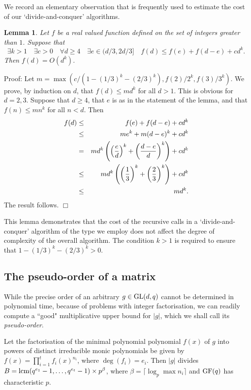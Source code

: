 \documentclass[12pt]{article}
\newtheorem{lemma}[definition]{Lemma}
\newenvironment{proof}{\normalsize {\sc Proof}:}{{\hfill $\Box$ \\}}
\def\lcm{{\rm lcm}}
\def\GL{{\rm GL}}
\def\Oh{O}  %
\def\GF{{\rm GF}}
\def\q{\quad}
\begin{document}
We record an elementary observation that is frequently used to estimate
the cost of our `divide-and-conquer' algorithms.
\begin{lemma}\label{d-a-c}
Let $f$ be a real valued function defined on the set of 
integers greater than $1$.
Suppose that 
$$\exists k>1\q\exists c>0\q\forall d\ge4\q\exists e\in(d/3,2d/3]\q 
f(d)\le f(e)+f(d-e)+cd^k.$$
Then $f(d)=\Oh(d^k)$.
\end{lemma}
\begin{proof}
Let $m=\max(c/(1-(1/3)^k-(2/3)^k),f(2)/2^k,f(3)/3^k)$.  
We prove, by induction on $d$, that
$f(d)\le md^k$ for all $d> 1$. This is obvious
for $d = 2, 3$. Suppose that $d\ge4$, that $e$ is 
as in the statement of the lemma,
and that $f(n)\le mn^k$ for all $n<d$.  Then
\begin{eqnarray*}
f(d) & \le & f(e)+f(d-e)+cd^k \\
 & \le & me^k+m(d-e)^k+cd^k \\
 & = & md^k\left(\left({e\over d}\right)^k+\left({d-e\over d}\right)^k\right)+cd^k \\
 & \le & md^k\left(\left({1\over3}\right)^k+\left({2\over3}\right)^k\right)+cd^k \\
 & \le & md^k. 
\end{eqnarray*}
The result follows.
\end{proof}

This lemma demonstrates that the cost of the recursive
calls in a `divide-and-conquer' algorithm of the type 
we employ does not affect the degree of complexity 
of the overall algorithm.  The condition $k>1$ is 
required to ensure that $1-(1/3)^k-(2/3)^k>0$.

\subsection{The pseudo-order of a matrix} \label{pseudo-order}
While the precise order of an arbitrary $g \in \GL(d, q)$ cannot
be determined in polynomial time, because of problems with
integer factorisation, we can readily compute
a ``good" multiplicative upper bound for $|g|$,
which we shall call its \emph{pseudo-order}.

Let the factorisation of the minimal polynomial polynomial $f(x)$
of $g$ into powers of distinct irreducible monic polynomials be given by
$f(x) = \prod_{i = 1}^t f_i(x)^{n_i}$,
where $\deg(f_i) = e_i$. Then $|g|$ divides
$B = {\lcm} (q^{e_1} - 1, \ldots, q^{e_t} - 1) \times p^\beta$,
where $\beta = \lceil \log_p \max n_i \rceil$ and $\GF(q)$
has characteristic $p$.
\end{document}
